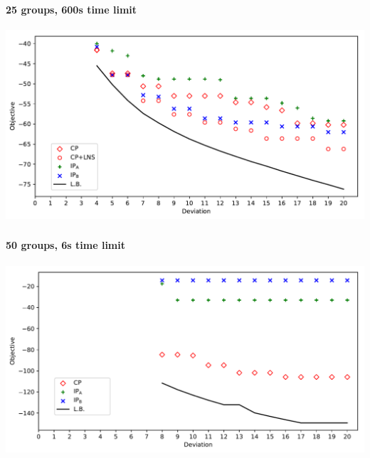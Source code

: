 \documentclass{beamer}
\newcommand{\AutoSectionTitle}{}
\begin{document}
\begin{frame}
  \frametitle{\AutoSectionTitle}
  \framesubtitle{25 groups, 600s time limit}

  \begin{center}
    \includegraphics[scale=0.5]{results_25groups_tl600.pdf}
  \end{center}
  
\end{frame}




\begin{frame}
  \frametitle{\AutoSectionTitle}
  \framesubtitle{50 groups, 6s time limit}

  \begin{center}
    \includegraphics[scale=0.5]{results_50groups_tl6.pdf}
  \end{center}
  
\end{frame}


\end{document}

